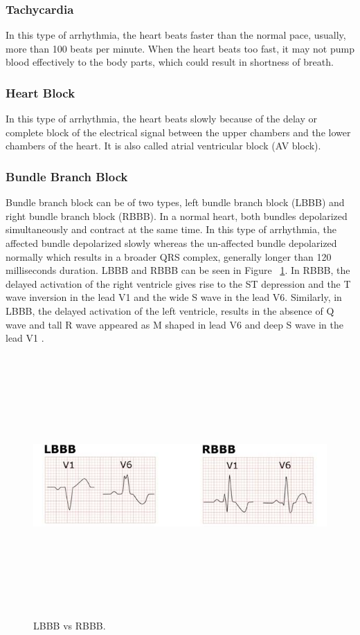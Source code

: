 \subsubsection{Tachycardia}
In this type of arrhythmia, the heart beats faster than the normal pace, usually, more than 100 beats per minute. When the heart beats too fast, it may not pump blood effectively to the body parts, which could result in shortness of breath.

\subsubsection{Heart Block}
In this type of arrhythmia, the heart beats slowly because of the delay or complete block of the electrical signal between the upper chambers and the lower chambers of the heart. It is also called atrial ventricular block (AV block).

\subsubsection{Bundle Branch Block}
Bundle branch block can be of two types, left bundle branch block (LBBB) and right bundle branch block (RBBB). In a normal heart, both bundles depolarized simultaneously and contract at the same time. In this type of arrhythmia, the affected bundle depolarized slowly whereas the un-affected bundle depolarized normally which results in a broader QRS complex, generally longer than 120 milliseconds duration. LBBB and RBBB can be seen in Figure ~\ref{fig:LRBBB}. In RBBB, the delayed activation of the right ventricle gives rise to the ST depression and the T wave inversion in the lead V1 and the wide S wave in the lead V6. Similarly, in LBBB, the delayed activation of the left ventricle, results in the absence of Q wave and tall R wave appeared as M shaped in lead V6 and deep S wave in the lead V1 \cite{cablesandsensors}.


\begin{figure}[htpb]
	\centering
	\includegraphics[width=12cm,height=10cm,keepaspectratio=true]{images/LRBBB}
	\caption{
		LBBB vs RBBB\cite{bilagi}.
	}
	\label{fig:LRBBB}
\end{figure}